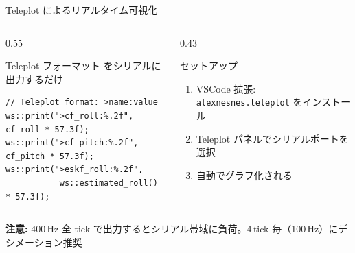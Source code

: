 \documentclass[aspectratio=169, 14pt]{beamer}
\begin{document}
\begin{frame}[fragile]{Teleplot によるリアルタイム可視化}
  \begin{columns}[c]
    \begin{column}{0.55\textwidth}
      \begin{block}{Teleplot フォーマット}
         をシリアルに出力するだけ
      \end{block}
      \begin{lstlisting}[style=sfcpp, basicstyle=\ttfamily\scriptsize]
// Teleplot format: >name:value
ws::print(">cf_roll:%.2f", cf_roll * 57.3f);
ws::print(">cf_pitch:%.2f", cf_pitch * 57.3f);
ws::print(">eskf_roll:%.2f",
           ws::estimated_roll() * 57.3f);
      \end{lstlisting}
    \end{column}
    \begin{column}{0.43\textwidth}
      \begin{exampleblock}{セットアップ}
        \begin{enumerate}
          \item VSCode 拡張: \texttt{alexnesnes.teleplot} をインストール
          \item Teleplot パネルでシリアルポートを選択
          \item 自動でグラフ化される
        \end{enumerate}
      \end{exampleblock}
    \end{column}
  \end{columns}

  \vspace{0.5em}
  {\footnotesize \textbf{注意:} 400\,Hz 全 tick で出力するとシリアル帯域に負荷。4\,tick 毎（100\,Hz）にデシメーション推奨}
\end{frame}
\end{document}

